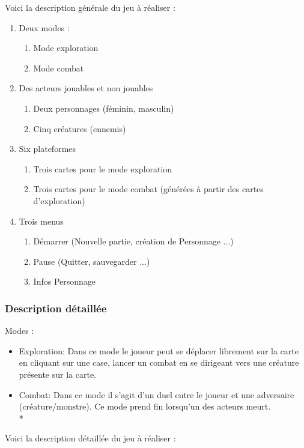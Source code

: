 \documentclass[11pt, a4paper]{article}
\begin{document}
Voici la description générale du jeu à réaliser :

\begin{enumerate}
\item Deux modes : 
	\begin{enumerate}
		\item Mode exploration
		\item Mode combat
	\end{enumerate}
\item Des acteurs jouables et non jouables
	\begin{enumerate}
		\item Deux personnages (féminin, masculin)
		\item Cinq créatures (ennemis)
	\end{enumerate}
\item Six plateformes
	\begin{enumerate}
		\item Trois cartes pour le mode exploration
		\item Trois cartes pour le mode combat (générées à partir des cartes d'exploration)
	\end{enumerate}
\item Trois menus
	\begin{enumerate}
		\item Démarrer (Nouvelle partie, création de Personnage ...)
		\item Pause (Quitter, sauvegarder ...)
		\item Infos Personnage
	\end{enumerate}
\end{enumerate}

\subsubsection{Description détaillée}
Modes : 
\begin{itemize}
\item Exploration: Dans ce mode le joueur peut se déplacer librement sur la carte en cliquant sur une case, lancer un combat en se dirigeant vers une créature présente sur la carte.
\item Combat: Dans ce mode il s’agit d’un duel entre le joueur et une adversaire (créature/monstre). Ce mode prend fin lorsqu’un des acteurs  meurt.\\*
\end{itemize}


Voici la description détaillée du jeu à réaliser :
\end{document}
